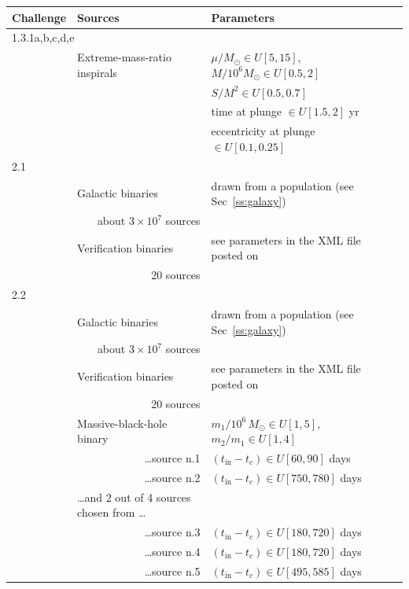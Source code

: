 \documentclass[12pt]{iopart}
\begin{document}
\begin{table}
\begin{tabular}{llll}
\hline
Challenge & Sources & Parameters \\
\hline
\multicolumn{2}{l}{1.3.1a,b,c,d,e} & \\
&Extreme-mass-ratio inspirals & $\mu/M_\odot \in U[5,15]$, $M / 10^6 M_\odot \in U[0.5,2]$ \\
 &                                             & $S/M^2 \in U[0.5, 0.7]$ \\
 &                                             & time at plunge $\in  U[1.5,2]$ yr \\
 &                                              & eccentricity at plunge $\in U[0.1, 0.25]$ \\
\hline
2.1 & & \\
&Galactic binaries & drawn from a population (see Sec~\ref{ss:galaxy})\\
&\multicolumn{1}{r}{about $3\times 10^7$ sources} & \\
&Verification binaries & see parameters in the XML file posted on~\cite{MLDCweb}\\
&\multicolumn{1}{r}{20 sources} \\
\hline
2.2 & & \\
&Galactic binaries & drawn from a population (see Sec~\ref{ss:galaxy})\\
&\multicolumn{1}{r}{about $3\times 10^7$ sources} \\
&Verification binaries & see parameters in the XML file posted on~\cite{MLDCweb} \\
&\multicolumn{1}{r}{20 sources} & \\
&Massive-black-hole binary & $m_1/10^6\,M_\odot \in U[1,5]$, $m_2/m_1 \in U[1,4]$ \\
&\multicolumn{1}{r}{\ldots source n.1} &  $(t_\mathrm{in} - t_c) \in U[60,90]$ days \\
&\multicolumn{1}{r}{\ldots source n.2} &  $(t_\mathrm{in} - t_c) \in U[750,780]$ days \\
&\ldots and 2 out of 4 sources chosen from \ldots & \\
&\multicolumn{1}{r}{\ldots source n.3} & $(t_\mathrm{in} - t_c) \in U[180,720]$ days \\
&\multicolumn{1}{r}{\ldots source n.4} &  $(t_\mathrm{in} - t_c) \in U[180,720]$ days\\
&\multicolumn{1}{r}{\ldots source n.5} &  $(t_\mathrm{in} - t_c) \in U[495,585]$ days\\

\end{tabular}
\end{table}
\end{document}
